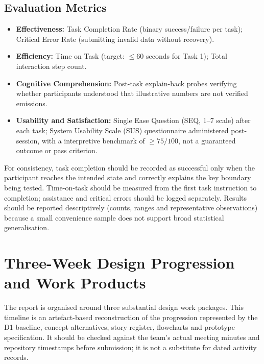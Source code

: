 \documentclass[12pt,a4paper]{article}
\begin{document}
\subsection{Evaluation Metrics}
\begin{itemize}[leftmargin=*]
  \item \textbf{Effectiveness:} Task Completion Rate (binary success/failure per task); Critical Error Rate (submitting invalid data without recovery).
  \item \textbf{Efficiency:} Time on Task (target: $\le 60$ seconds for Task 1); Total interaction step count.
  \item \textbf{Cognitive Comprehension:} Post-task explain-back probes verifying whether participants understood that illustrative numbers are not verified emissions.
  \item \textbf{Usability and Satisfaction:} Single Ease Question (SEQ, 1--7 scale) after each task; System Usability Scale (SUS) questionnaire administered post-session, with a interpretive benchmark of $\ge 75/100$, not a guaranteed outcome or pass criterion.
\end{itemize}

For consistency, task completion should be recorded as successful only when the participant reaches the intended state and correctly explains the key boundary being tested. Time-on-task should be measured from the first task instruction to completion; assistance and critical errors should be logged separately. Results should be reported descriptively (counts, ranges and representative observations) because a small convenience sample does not support broad statistical generalisation.

\section{Three-Week Design Progression and Work Products}

The report is organised around three substantial design work packages. This timeline is an artefact-based reconstruction of the progression represented by the D1 baseline, concept alternatives, story register, flowcharts and prototype specification. It should be checked against the team's actual meeting minutes and repository timestamps before submission; it is not a substitute for dated activity records.
\end{document}
